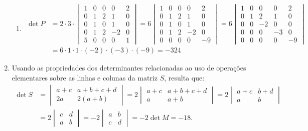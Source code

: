 \documentclass[12pt,a4paper]{article}
\begin{document}
\begin{enumerate}
\begin{enumerate}
\item
\begin{align*}
\det{P}
& =
2 \cdot 3 \cdot
\begin{vmatrix}
 1 & 0 & 0 & 0 & 2 \\
 0 & 1 & 2 & 1 & 0 \\
 0 & 1 & 0 & 1 & 0 \\
 0 & 1 & 2 & -2 & 0 \\
 5 & 0 & 0 & 0 & 1 
\end{vmatrix}
=
6
\begin{vmatrix}
 1 & 0 & 0 & 0 & 2 \\
 0 & 1 & 2 & 1 & 0 \\
 0 & 1 & 0 & 1 & 0 \\
 0 & 1 & 2 & -2 & 0 \\
 0 & 0 & 0 & 0 & -9 
\end{vmatrix}
=
6
\begin{vmatrix}
 1 & 0 & 0 & 0 & 2 \\
 0 & 1 & 2 & 1 & 0 \\
 0 & 0 & -2 & 0 & 0 \\
 0 & 0 & 0 & -3 & 0 \\
 0 & 0 & 0 & 0 & -9 
\end{vmatrix} \\
& =
6 \cdot 1 \cdot 1 \cdot (-2) \cdot (-3) \cdot (-9)
= -324
\end{align*}
\end{enumerate}

\item Usando as propriedades dos determinantes relacionadas ao uso de operações elementares sobre as linhas e colunas da matriz $S$, resulta que:
\begin{align*}
\det{S}
& = \begin{vmatrix}
a+c & a+b+c+d \\
2a & 2(a+b)
\end{vmatrix}
= 2
\begin{vmatrix}
a+c & a+b+c+d \\
a & a+b
\end{vmatrix}
= 2
\begin{vmatrix}
a+c & b+d \\
a & b
\end{vmatrix} \\
& = 2
\begin{vmatrix}
c & d \\
a & b
\end{vmatrix}
= -2
\begin{vmatrix}
a & b \\
c & d
\end{vmatrix}
= -2 \det{M}
=-18.
\end{align*}


\end{enumerate}
\end{document}
